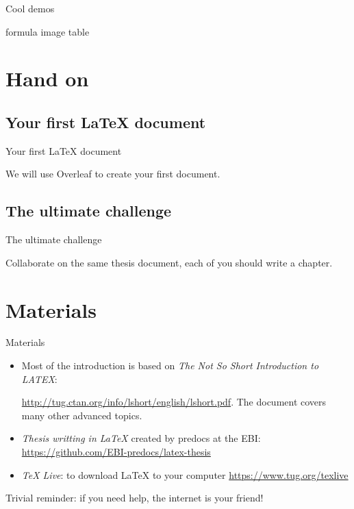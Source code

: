 \documentclass[inputenc]{beamer}
\begin{document}
\begin{frame}{Cool demos}
    
    formula
    image
    table
    
\end{frame}


\section{Hand on}

\subsection{Your first LaTeX document}

\begin{frame}{Your first LaTeX document}
    
    We will use Overleaf to create your first document.
    
\end{frame}

\subsection{The ultimate challenge}

\begin{frame}{The ultimate challenge}
    
    Collaborate on the same thesis document, each of you should write a chapter.
    
\end{frame}

\section{Materials}

\begin{frame}{Materials}

\begin{itemize}
    \item Most of the introduction is based on \textit{The Not So Short Introduction to LATEX}:
    
    \url{http://tug.ctan.org/info/lshort/english/lshort.pdf}. The document covers many other advanced topics.
    \item \textit{Thesis writting in LaTeX} created by predocs at the EBI: \url{https://github.com/EBI-predocs/latex-thesis}
    \item \textit{TeX Live}: to download LaTeX to your computer \url{https://www.tug.org/texlive}
\end{itemize}

Trivial reminder: if you need help, the internet is your friend!

\end{frame}
\end{document}
